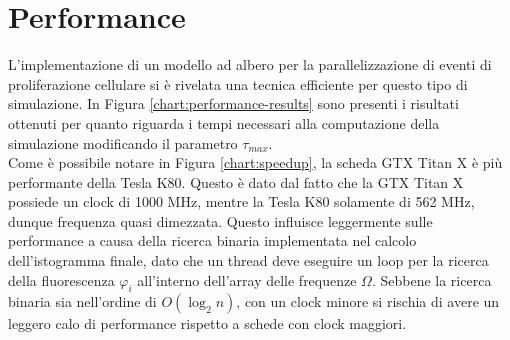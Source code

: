 \section{Performance}

\label{sec:performance}

L'implementazione di un modello ad albero per la parallelizzazione di eventi
di proliferazione cellulare si è rivelata una tecnica efficiente per questo
tipo di simulazione. In Figura \ref{chart:performance-results}
sono presenti i risultati ottenuti per
quanto riguarda i tempi necessari alla computazione della simulazione
modificando il parametro $\tau_{max}$.
\\
Come è possibile notare in Figura \ref{chart:speedup}, la scheda
GTX Titan X è più performante della Tesla K80. Questo è dato dal fatto che
la GTX Titan X possiede un clock di 1000 MHz, mentre la Tesla K80 solamente di
562 MHz, dunque frequenza quasi dimezzata. Questo influisce leggermente sulle
performance a causa della ricerca binaria implementata nel calcolo
dell'istogramma finale, dato che un thread deve eseguire un loop per la ricerca
della fluorescenza $\varphi_{i}$ all'interno dell'array delle frequenze $\Omega$.
Sebbene la ricerca binaria sia nell'ordine di $O(\log_{2}{n})$, con un clock
minore si rischia di avere un leggero calo di performance rispetto a schede
con clock maggiori.
\\
